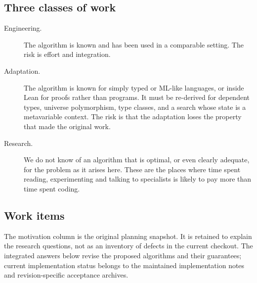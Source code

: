 \subsection{Three classes of work}

\begin{description}
\item[ Engineering.] The algorithm is known and has been used in a comparable setting. The risk is effort and integration.
\item[ Adaptation.] The algorithm is known for simply typed or ML-like languages, or inside Lean for proofs rather than programs. It must be re-derived for dependent types, universe polymorphism, type classes, and a search whose state is a metavariable context. The risk is that the adaptation loses the property that made the original work.
\item[ Research.] We do not know of an algorithm that is optimal, or even clearly adequate, for the problem as it arises here. These are the places where time spent reading, experimenting and talking to specialists is likely to pay more than time spent coding.
\end{description}

\subsection{Work items}

The motivation column is the original  planning snapshot. It is
retained to explain the research questions, not as an inventory of defects in
the current checkout. The integrated answers below revise the proposed
algorithms and their guarantees; current implementation status belongs to the
maintained implementation notes and revision-specific acceptance archives.


